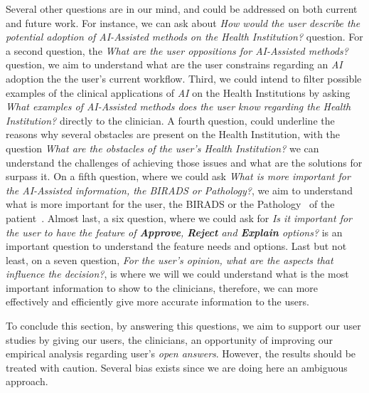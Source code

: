Several other questions are in our mind, and could be addressed on both current and future work. For instance, we can ask about \textit{How would the user describe the potential adoption of \textit{AI-Assisted} methods on the Health Institution?} question. For a second question, the \textit{What are the user oppositions for \textit{AI-Assisted} methods?} question, we aim to understand what are the user constrains regarding an {\it AI} adoption the the user's current workflow. Third, we could intend to filter possible examples of the clinical applications of {\it AI} on the Health Institutions by asking \textit{What examples of \textit{AI-Assisted} methods does the user know regarding the Health Institution?} directly to the clinician. A fourth question, could underline the reasons why several obstacles are present on the Health Institution, with the question \textit{What are the obstacles of the user's Health Institution?} we can understand the challenges of achieving those issues and what are the solutions for surpass it. On a fifth question, where we could ask \textit{What is more important for the \textit{AI-Assisted} information, the BIRADS or Pathology?}, we aim to understand what is more important for the user, the BIRADS or the Pathology~\cite{maicas2018pre} of the patient~\cite{elverici2015nonpalpable}. Almost last, a six question, where we could ask for \textit{Is it important for the user to have the feature of \textbf{Approve}, \textbf{Reject} and \textbf{Explain} options?} is an important question to understand the feature needs and options. Last but not least, on a seven question, \textit{For the user's opinion, what are the aspects that influence the decision?}, is where we will we could understand what is the most important information to show to the clinicians, therefore, we can more effectively and efficiently give more accurate information to the users.

To conclude this section, by answering this questions, we aim to support our user studies by giving our users, the clinicians, an opportunity of improving our empirical analysis regarding user's \textit{open answers}. However, the results should be treated with caution. Several bias exists since we are doing here an ambiguous approach.

\clearpage